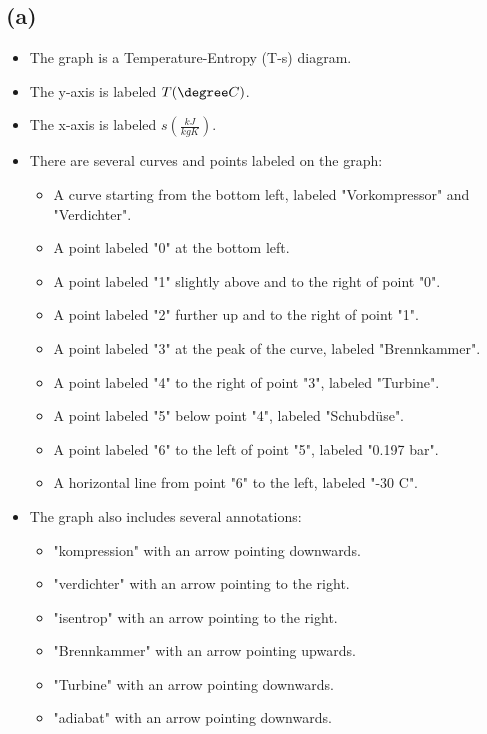 

\subsection*{(a)}

\begin{itemize}
    \item The graph is a Temperature-Entropy (T-s) diagram.
    \item The y-axis is labeled \( T (\degree C) \).
    \item The x-axis is labeled \( s \left( \frac{kJ}{kgK} \right) \).
    \item There are several curves and points labeled on the graph:
        \begin{itemize}
            \item A curve starting from the bottom left, labeled "Vorkompressor" and "Verdichter".
            \item A point labeled "0" at the bottom left.
            \item A point labeled "1" slightly above and to the right of point "0".
            \item A point labeled "2" further up and to the right of point "1".
            \item A point labeled "3" at the peak of the curve, labeled "Brennkammer".
            \item A point labeled "4" to the right of point "3", labeled "Turbine".
            \item A point labeled "5" below point "4", labeled "Schubdüse".
            \item A point labeled "6" to the left of point "5", labeled "0.197 bar".
            \item A horizontal line from point "6" to the left, labeled "-30 \degree C".
        \end{itemize}
    \item The graph also includes several annotations:
        \begin{itemize}
            \item "kompression" with an arrow pointing downwards.
            \item "verdichter" with an arrow pointing to the right.
            \item "isentrop" with an arrow pointing to the right.
            \item "Brennkammer" with an arrow pointing upwards.
            \item "Turbine" with an arrow pointing downwards.
            \item "adiabat" with an arrow pointing downwards.
        \end{itemize}
\end{itemize}